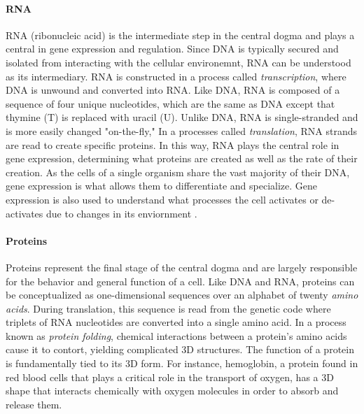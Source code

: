 \paragraph{RNA} RNA (ribonucleic acid) is the intermediate step in the central dogma and plays a central in gene expression and regulation.
Since DNA is typically secured and isolated from interacting with the cellular environemnt, RNA can be understood as its intermediary.
RNA is constructed in a process called \emph{transcription}, where DNA is unwound and converted into RNA.
Like DNA, RNA is composed of a sequence of four unique nucleotides, which are the same as DNA except that thymine (T) is replaced with uracil (U).
Unlike DNA, RNA is single-stranded and is more easily changed "on-the-fly,"
In a processes called \emph{translation}, RNA strands are read to create specific proteins.
In this way, RNA plays the central role in gene expression, determining what proteins are created as well as the rate of their creation.
As the cells of a single organism share the vast majority of their DNA, 
gene expression is what allows them to differentiate and specialize.
Gene expression is also used to understand what processes the cell activates or de-activates due to changes in its enviornment \cite{need}.

\paragraph{Proteins} Proteins represent the final stage of the central dogma and are largely responsible for the behavior and general function of a cell.
Like DNA and RNA, proteins can be conceptualized as one-dimensional sequences over an alphabet of twenty \emph{amino acids}.
During translation, this sequence is read from the genetic code where triplets of RNA nucleotides are converted into a single amino acid.
In a process known as \emph{protein folding}, chemical interactions between a protein's amino acids cause it to contort, yielding complicated 3D structures.
The function of a protein is fundamentally tied to its 3D form.
For instance, hemoglobin, a protein found in red blood cells that plays a critical role in the transport of oxygen, has a 3D shape that interacts chemically with oxygen molecules in order to absorb and release them.


